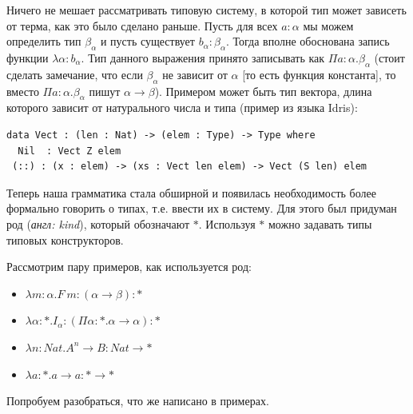 Ничего не мешает рассматривать типовую систему, в которой тип может зависеть от терма, как это было сделано раньше. Пусть для всех $a : \alpha$ мы можем определить тип $\beta_\alpha$ и пусть существует $b_\alpha : \beta_\alpha$. Тогда вполне обоснована запись функции $\lambda \alpha : b_\alpha$. Тип данного выражения принято записывать как $\Pi a :\alpha . \beta_\alpha$ (стоит сделать замечание, что если $\beta_\alpha$ не зависит от $\alpha$ [то есть функция константа], то вместо $\Pi a :\alpha . \beta_\alpha$ пишут $\alpha \rightarrow \beta$). Примером может быть тип вектора, длина которого зависит от натурального числа и типа (пример из языка Idris):
\begin{verbatim}
data Vect : (len : Nat) -> (elem : Type) -> Type where
  Nil  : Vect Z elem
 (::) : (x : elem) -> (xs : Vect len elem) -> Vect (S len) elem
\end{verbatim}

Теперь наша грамматика стала обширной и появилась необходимость более формально говорить о типах, т.е. ввести их в систему. Для этого был придуман род (\textit{англ: kind}), который обозначают $*$. Используя $*$ можно задавать типы типовых конструкторов. 

Рассмотрим пару примеров, как используется род:

\begin{itemize}
    \item $\lambda m : \alpha.F\ m : (\alpha \rightarrow \beta) : *$
    \item $\lambda \alpha : *.I_\alpha : (\Pi \alpha : * . \alpha \rightarrow \alpha):*$
    \item $\lambda n : Nat . A^n \rightarrow B : Nat \rightarrow *$
    \item $\lambda a : *. a \rightarrow a : * \rightarrow *$
\end{itemize}

Попробуем разобраться, что же написано в примерах. 

